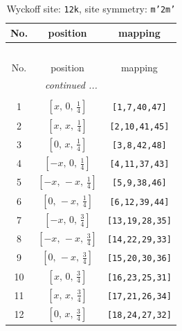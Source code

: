 \documentclass[fleqn,8pt]{jsarticle}
\begin{document}
\begin{longtable}{ccc}
\caption{Wyckoff site: {\tt 12k}, site symmetry: {\tt m'2m'}}
 \\
 \hline \hline
No. & position & mapping \\ \hline \endfirsthead

\multicolumn{2}{l}{\tablename\ \thetable{}} \\
 \hline \hline
No. & position & mapping \\ \hline \endhead

 \hline \hline
\multicolumn{2}{r}{\footnotesize\it continued ...} \\ \endfoot

 \hline \hline
\multicolumn{2}{r}{} \\ \endlastfoot

1 & $\left[ x,\, 0,\, \frac{1}{4} \right]$ & {\tt [1,7,40,47]} \\ \hline
2 & $\left[ x,\, x,\, \frac{1}{4} \right]$ & {\tt [2,10,41,45]} \\ \hline
3 & $\left[ 0,\, x,\, \frac{1}{4} \right]$ & {\tt [3,8,42,48]} \\ \hline
4 & $\left[ - x,\, 0,\, \frac{1}{4} \right]$ & {\tt [4,11,37,43]} \\ \hline
5 & $\left[ - x,\, - x,\, \frac{1}{4} \right]$ & {\tt [5,9,38,46]} \\ \hline
6 & $\left[ 0,\, - x,\, \frac{1}{4} \right]$ & {\tt [6,12,39,44]} \\ \hline
7 & $\left[ - x,\, 0,\, \frac{3}{4} \right]$ & {\tt [13,19,28,35]} \\ \hline
8 & $\left[ - x,\, - x,\, \frac{3}{4} \right]$ & {\tt [14,22,29,33]} \\ \hline
9 & $\left[ 0,\, - x,\, \frac{3}{4} \right]$ & {\tt [15,20,30,36]} \\ \hline
10 & $\left[ x,\, 0,\, \frac{3}{4} \right]$ & {\tt [16,23,25,31]} \\ \hline
11 & $\left[ x,\, x,\, \frac{3}{4} \right]$ & {\tt [17,21,26,34]} \\ \hline
12 & $\left[ 0,\, x,\, \frac{3}{4} \right]$ & {\tt [18,24,27,32]} \\
\end{longtable}
\renewcommand{\arraystretch}{1.2}
\end{document}
